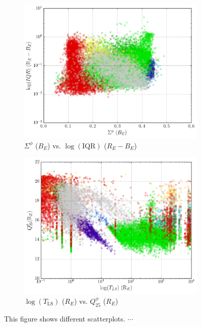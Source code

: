 \begin{figure}[h]
\begin{subfigure}[t]{0.49\textwidth}
		\centering
		\caption{$\Sigma^\phi$ ($B_E$) vs. $\log(\text{IQR})$ ($R_E - B_E$)}
		\label{fig:2e}
		\includegraphics[width=\textwidth]{figures/scatterplots/B-phase-cs-R-B-IQR.png}		
	\end{subfigure}
	\begin{subfigure}[t]{0.49\textwidth}
		\centering
		\caption{$\log(T_{\text{LS}})$ ($R_E$) vs. $Q_{25}^\phi$ ($R_E$)}
		\label{fig:2f}
		\includegraphics[width=\textwidth]{figures/scatterplots/R-ls-period-R-phase-q25.png}		
	\end{subfigure}
	\caption[Scatterplots for different features with reasonable separation.]{This figure shows different scatterplots. $\cdots$\\}
	\label{fig:features-scatterplot}
\end{figure}

